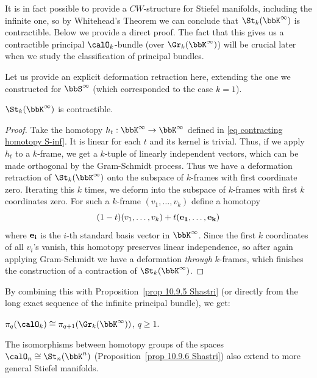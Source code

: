 \begin{rem}
    It is in fact possible to provide a $CW$-structure for Stiefel manifolds, including the infinite one, so by Whitehead's Theorem we can conclude that $\St_k(\bbK^\infty)$ is contractible. Below we provide a direct proof. The fact that this gives us a contractible principal $\calO_k$-bundle (over $\Gr_k(\bbK^\infty)$) will be crucial later when we study the classification of principal bundles.
\end{rem}

Let us provide an explicit deformation retraction here, extending the one we constructed for $\bbS^\infty$ (which corresponded to the case $k=1$).
\begin{prop}
    $\St_k(\bbK^\infty)$ is contractible.
\end{prop}
\begin{proof}
    Take the homotopy $h_t:\bbK^\infty\to \bbK^\infty$ defined in \eqref{eq contracting homotopy S-inf}. It is linear for each $t$ and its kernel is trivial. Thus, if we apply $h_t$ to a $k$-frame, we get a $k$-tuple of linearly independent vectors, which can be made orthogonal by the Gram-Schmidt process. Thus we have a deformation retraction of $\St_k(\bbK^\infty)$ onto the subspace of $k$-frames with first coordinate zero. Iterating this $k$ times, we deform into the subspace of $k$-frames with first $k$ coordinates zero. For such a $k$-frame $(v_1,\ldots,v_k)$ define a homotopy
    \[(1-t)(v_1,\ldots,v_k)+t(\bf{e}_1,\ldots,\bf{e}_k)\]
    where $\bf{e}_i$ is the $i$-th standard basis vector in $\bbK^\infty$. Since the first $k$ coordinates of all $v_i$'s vanish, this homotopy preserves linear independence, so after again applying Gram-Schmidt we have a deformation \emph{through} $k$-frames, which finishes the construction of a contraction of $\St_k(\bbK^\infty)$.
\end{proof}
By combining this with Proposition~\ref{prop 10.9.5 Shastri} (or directly from the long exact sequence of the infinite principal bundle), we get:
\begin{cor}
   $\pi_q(\calO_k)\cong \pi_{q+1}(\Gr_k(\bbK^\infty))$, $q\geq 1$.
\end{cor}

The isomorphisms between homotopy groups of the spaces $\calO_n\cong \St_{n}(\bbK^n)$ (Proposition~\ref{prop 10.9.6 Shastri}) also extend to more general Stiefel manifolds. 

